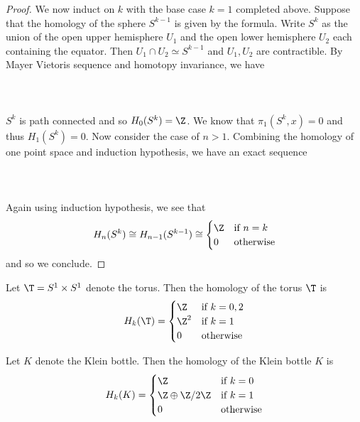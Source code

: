 \documentclass[a4paper]{article}
\begin{document}
\begin{thm}{}{}
\begin{proof}
We now induct on $k$ with the base case $k=1$ completed above. Suppose that the homology of the sphere $S^{k-1}$ is given by the formula. Write $S^k$ as the union of the open upper hemisphere $U_1$ and the open lower hemisphere $U_2$ each containing the equator. Then $U_1\cap U_2\simeq S^{k-1}$ and $U_1,U_2$ are contractible. By Mayer Vietoris sequence and homotopy invariance, we have \\~\\
\\~\\
$S^k$ is path connected and so $H_0(S^k)=\Z$. We know that $\pi_1(S^k,x)=0$ and thus $H_1(S^k)=0$. Now consider the case of $n>1$. Combining the homology of one point space and induction hypothesis, we have an exact sequence \\~\\
\\~\\
Again using induction hypothesis, we see that $$H_n(S^k)\cong H_{n-1}(S^{k-1})\cong\begin{cases}
\Z & \text{if } n=k\\
0 & \text{otherwise}
\end{cases}$$
and so we conclude. 
\end{proof}
\end{thm}

\begin{thm}{}{} Let $\T=S^1\times S^1$ denote the torus. Then the homology of the torus $\T$ is $$H_k(\T)=\begin{cases}
\Z & \text{if } k=0,2\\
\Z^2 & \text{if } k=1\\
0 & \text{otherwise}
\end{cases}$$
\end{thm}

\begin{thm}{}{} Let $K$ denote the Klein bottle. Then the homology of the Klein bottle $K$ is $$H_k(K)=\begin{cases}
\Z & \text{if } k=0\\
\Z\oplus\Z/2\Z & \text{if } k=1\\
0 & \text{otherwise}
\end{cases}$$
\end{thm}
\end{document}
